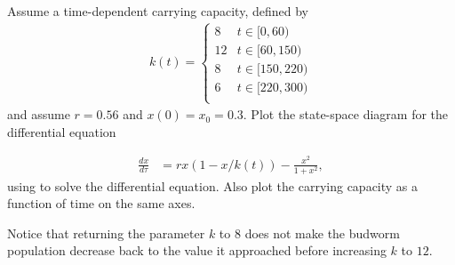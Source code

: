 \begin{problem}
Assume a time-dependent carrying capacity, defined by 
\begin{align*}	
k(t) = \begin{cases}
  8  & t \in [0,60) \\
  12  & t \in [60,150) \\
  8 & t \in [150,220) \\
  6 & t \in [220,300) \\
\end{cases}
\end{align*}
 and assume $r=0.56$ and $x(0)=x_0=0.3$. Plot the state-space diagram for the differential equation

\begin{align*}
	\frac{dx}{d \tau} &= rx(1-x/k(t)) - \frac{x^2}{1+x^2},
\end{align*}
using  to solve the differential equation. Also plot the carrying capacity as a function of time on the same axes.

Notice that returning the parameter $k$ to $8$ does not make the budworm population decrease back to the value it approached before increasing $k$ to $12$.

\end{problem} 
